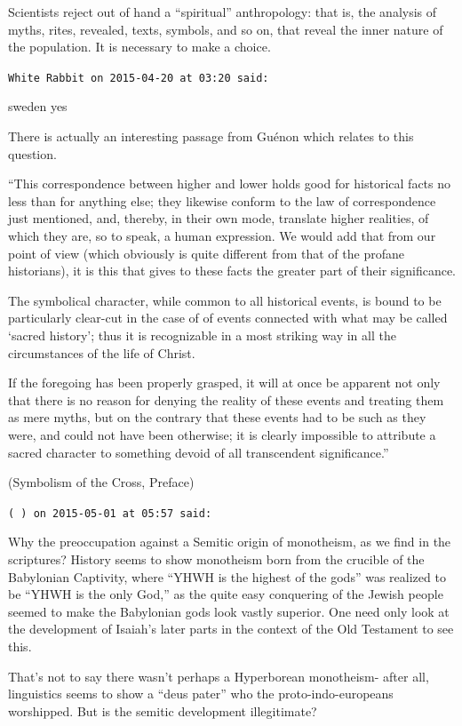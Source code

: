 \begin{footnotesize}
\begin{sffamily}
Scientists reject out of hand a ``spiritual'' anthropology: that is, the analysis of myths, rites, revealed, texts, symbols, and so on, that reveal the inner nature of the population. It is necessary to make a choice.

\hfill

\texttt{White Rabbit on 2015-04-20 at 03:20 said:}

sweden yes

There is actually an interesting passage from Guénon which relates to this question.

``This correspondence between higher and lower holds good for historical facts no less than for anything else; they likewise conform to the law of correspondence just mentioned, and, thereby, in their own mode, translate higher realities, of which they are, so to speak, a human expression. We would add that from our point of view (which obviously is quite different from that of the profane historians), it is this that gives to these facts the greater part of their significance.

The symbolical character, while common to all historical events, is bound to be particularly clear-cut in the case of of events connected with what may be called `sacred history'; thus it is recognizable in a most striking way in all the circumstances of the life of Christ.

If the foregoing has been properly grasped, it will at once be apparent not only that there is no reason for denying the reality of these events and treating them as mere myths, but on the contrary that these events had to be such as they were, and could not have been otherwise; it is clearly impossible to attribute a sacred character to something devoid of all transcendent significance.''

(Symbolism of the Cross, Preface)

\hfill

\texttt{( ) on 2015-05-01 at 05:57 said:}

Why the preoccupation against a Semitic origin of monotheism, as we find in the scriptures? History seems to show monotheism born from the crucible of the Babylonian Captivity, where ``YHWH is the highest of the gods'' was realized to be ``YHWH is the only God,'' as the quite easy conquering of the Jewish people seemed to make the Babylonian gods look vastly superior. One need only look at the development of Isaiah's later parts in the context of the Old Testament to see this.

That's not to say there wasn't perhaps a Hyperborean monotheism- after all, linguistics seems to show a ``deus pater'' who the proto-indo-europeans worshipped. But is the semitic development illegitimate?


\end{sffamily}
\end{footnotesize}
